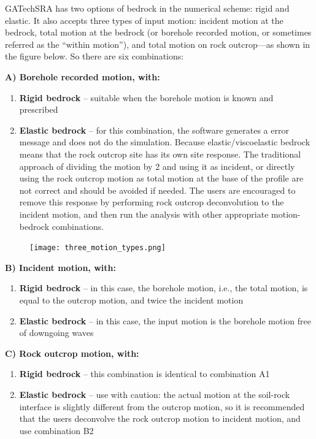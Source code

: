 \documentclass[11pt,letterpaper]{article}
\begin{document}
GATechSRA has two options of bedrock in the numerical scheme: rigid and elastic. It also accepts three types of input motion: incident motion at the bedrock, total motion at the bedrock (or borehole recorded motion, or sometimes referred as the ``within motion''), and total motion on rock outcrop---as shown in the figure below. So there are six combinations:

\noindent\textbf{A)	Borehole recorded motion, with:}
\vspace{-10pt}
\begin{enumerate}
\item \textbf{Rigid bedrock} -- suitable when the borehole motion is known and prescribed
\item \textbf{Elastic bedrock} -- for this combination, the software generates a error message and does not do the simulation. Because elastic/viscoelastic bedrock means that the rock outcrop site has its own site response. The traditional approach of dividing the motion by 2 and using it as incident, or directly using the rock outcrop motion as total motion at the base of the profile are not correct and should be avoided if needed. The users are encouraged to remove this response by performing rock outcrop deconvolution to the incident motion, and then run the analysis with other appropriate motion-bedrock combinations.
\end{enumerate}

\begin{figure}
\begin{center}
  \texttt{[image: three\_motion\_types.png]}\\
\end{center}
\end{figure}

\noindent\textbf{B) Incident motion, with:}
\vspace{-10pt}
\begin{enumerate}
\item \textbf{Rigid bedrock} -- in this case, the borehole motion, i.e., the total motion, is equal to the outcrop motion, and twice the incident motion
\item \textbf{Elastic bedrock} -- in this case, the input motion is the borehole motion free of downgoing waves
\end{enumerate}

\noindent\textbf{C) Rock outcrop motion, with:}
\vspace{-10pt}
\begin{enumerate}
\item \textbf{Rigid bedrock} -- this combination is identical to combination A1
\item \textbf{Elastic bedrock} -- use with caution: the actual motion at the soil-rock interface is slightly different from the outcrop motion, so it is recommended that the users deconvolve the rock outcrop motion to incident motion, and use combination B2
\end{enumerate}
\end{document}
